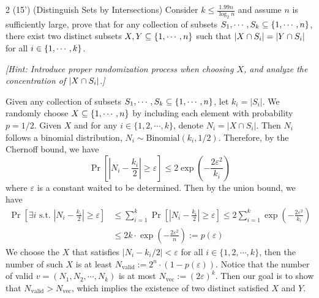 
    \begin{question}{2 (15') (Distinguish Sets by Intersections)}
    Consider $k \leq \frac{1.99n}{\log_2{n}}$ and assume $n$ is sufficiently large, prove that for any collection of subsets $S_1, \cdots, S_k \subseteq \qty{1, \cdots, n}$, there exist two distinct subsets $X, Y \subseteq \qty{1, \cdots, n}$ such that $\abs{X \cap S_i} = \abs{Y \cap S_i}$ for all $i \in \qty{1, \cdots, k}$.

    \textit{[Hint: Introduce proper randomization process when choosing $X$, and analyze the concentration of $\abs{X\cap S_i}$.]}
    \end{question}


\begin{answer}
    Given any collection of subsets $S_1, \cdots, S_k \subseteq \qty{1, \cdots, n}$, let $k_i = |S_i|$. 
    We randomly choose $X \subseteq \qty{1, \cdots, n}$ by including each element with probability $p = 1/2$. 
    Given $X$ and for any $i\in \{1,2, \cdots, k\}$, denote $N_i = |X \cap S_i|$. 
    Then $N_i$ follows a binomial distribution, $N_i \sim \text{Binomial}(k_i, 1/2)$.
    Therefore, by the Chernoff bound, we have
    \begin{equation*}
        \Pr\left[\left|N_i - \frac{k_i}{2}\right| \ge \varepsilon\right] \leq 2\exp\left(-\frac{2 \varepsilon^2}{k_i}\right)
    \end{equation*}
    where $\varepsilon$ is a constant waited to be determined. Then by the union bound, we have
    \begin{align*}
        \Pr\left[\exists i \text{ s.t. }  \left|N_i - \frac{k_i}{2}\right| \ge \varepsilon \right] &\le \sum_{i=1}^k \Pr\left[\left|N_i - \frac{k_i}{2}\right| \ge \varepsilon\right]  \le 2 \sum_{i=1}^k \exp\left(-\frac{2 \varepsilon^2}{k_i}\right) \\
        &\le 2k \cdot \exp\left(-\frac{2 \varepsilon^2}{n}\right) := p(\varepsilon)
    \end{align*}
    We choose the $X$ that satisfies $\left|N_i - k_i / 2\right| < \varepsilon$ for all $i\in \{1,2, \cdots, k\}$, 
    then the number of such $X$ is at least $N_\text{valid} := 2^n \cdot (1 - p(\varepsilon))$. 
    Notice that the number of valid $v = (N_1, N_2, \cdots, N_k)$ is at most $N_\text{vec} := (2\varepsilon)^k$. 
    Then our goal is to show that $N_\text{valid} >  N_\text{vec}$, which implies the existence of two distinct satisfied $X$ and $Y$. 


\end{answer}
